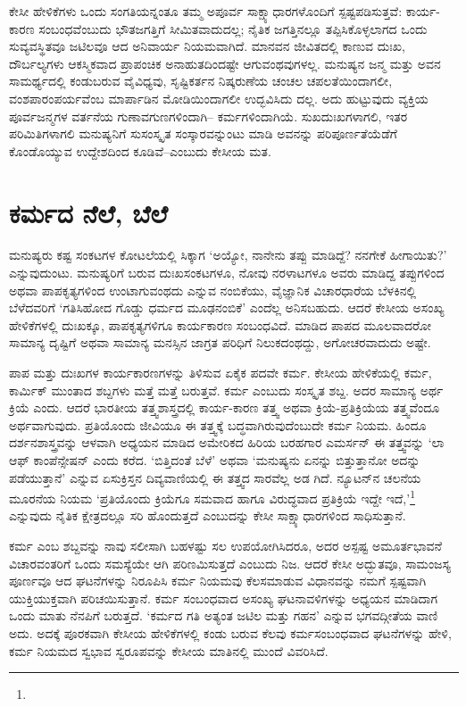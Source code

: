 ಕೇಸೀ ಹೇಳಿಕೆಗಳು ಒಂದು ಸಂಗತಿಯನ್ನಂತೂ ತಮ್ಮ ಅಪೂರ್ವ ಸಾಕ್ಷ್ಯಾಧಾರಗಳೊಂದಿಗೆ ಸ್ಪಷ್ಟಪಡಿಸುತ್ತವೆ: ಕಾರ್ಯ-ಕಾರಣ ಸಂಬಂಧವೆಂಬುದು ಭೌತಜಗತ್ತಿಗೆ ಸೀಮಿತವಾದುದಲ್ಲ; ನೈತಿಕ ಜಗತ್ತಿನಲ್ಲೂ ತಪ್ಪಿಸಿಕೊಳ್ಳಲಾಗದ ಒಂದು ಸುವ್ಯವಸ್ಥಿತವೂ ಜಟಿಲವೂ ಆದ ಅನಿವಾರ್ಯ ನಿಯಮವಾಗಿದೆ. ಮಾನವನ ಜೀವಿತದಲ್ಲಿ ಕಾಣುವ ದುಃಖ, ದೌರ್ಬಲ್ಯಗಳು ಆಕಸ್ಮಿಕವಾದ ಪ್ರಾಪಂಚಿಕ ಅನಾಹುತದಿಂದಷ್ಟೇ ಆಗುವಂಥವುಗಳಲ್ಲ. ಮನುಷ್ಯನ ಜನ್ಮ ಮತ್ತು ಅವನ ಸಾಮರ್ಥ್ಯದಲ್ಲಿ ಕಂಡುಬರುವ ವೈವಿಧ್ಯವು, ಸೃಷ್ಟಿಕರ್ತನ ನಿಷ್ಕರುಣೆಯ ಚಂಚಲ ಚಪಲತೆಯಿಂದಾಗಲೀ, ವಂಶಪಾರಂಪರ್ಯವೆಂಬ ಮಾರ್ಪಾಡಿನ ಮೋಡಿಯಿಂದಾಗಲೀ ಉದ್ಭವಿಸಿದು ದಲ್ಲ. ಅದು ಹುಟ್ಟುವುದು ವ್ಯಕ್ತಿಯ ಪೂರ್ವಜನ್ಮಗಳ ವರ್ತನೆಯ ಗುಣಾವಗುಣಗಳಿಂದಾಗಿ– ಕರ್ಮಗಳಿಂದಾಗಿಯೆ. ಸುಖದುಃಖಗಳಾಗಲಿ, ಇತರ ಪರಿಮಿತಿಗಳಾಗಲಿ ಮನುಷ್ಯನಿಗೆ ಸುಸಂಸ್ಕೃತ ಸಂಸ್ಕಾರವನ್ನುಂಟು ಮಾಡಿ ಅವನನ್ನು ಪರಿಪೂರ್ಣತೆಯೆಡೆಗೆ ಕೊಂಡೊಯ್ಯುವ ಉದ್ದೇಶದಿಂದ ಕೂಡಿವೆ–ಎಂಬುದು ಕೇಸೀಯ ಮತ.


\section{ಕರ್ಮದ ನೆಲೆ, ಬೆಲೆ}

ಮನುಷ್ಯರು ಕಷ್ಟ ಸಂಕಟಗಳ ಕೋಟಲೆಯಲ್ಲಿ ಸಿಕ್ಕಾಗ ‘ಅಯ್ಯೋ, ನಾನೇನು ತಪ್ಪು ಮಾಡಿದ್ದೆ? ನನಗೇಕೆ ಹೀಗಾಯಿತು?’ ಎನ್ನುವುದುಂಟು. ಮನುಷ್ಯರಿಗೆ ಬರುವ ದುಃಖಸಂಕಟಗಳೂ, ನೋವು ನರಳಾಟಗಳೂ ಅವರು ಮಾಡಿದ್ದ ತಪ್ಪುಗಳಿಂದ ಅಥವಾ ಪಾಪಕೃತ್ಯಗಳಿಂದ ಉಂಟಾಗುವಂಥದು ಎನ್ನುವ ನಂಬಿಕೆಯು, ವೈಜ್ಞಾನಿಕ ವಿಚಾರಧಾರೆಯ ಬೆಳಕಿನಲ್ಲಿ ಬೆಳೆದವರಿಗೆ ‘ಗತಿಸಿಹೋದ ಗೊಡ್ಡು ಧರ್ಮದ ಮೂಢನಂಬಿಕೆ’ ಎಂದೆಲ್ಲ ಅನಿಸಬಹುದು. ಆದರೆ ಕೇಸೀಯ ಅಸಂಖ್ಯ ಹೇಳಿಕೆಗಳಲ್ಲಿ ದುಃಖಕ್ಕೂ, ಪಾಪಕೃತ್ಯಗಳಿಗೂ ಕಾರ್ಯಕಾರಣ ಸಂಬಂಧವಿದೆ. ಮಾಡಿದ ಪಾಪದ ಮೂಲವಾದರೋ ಸಾಮಾನ್ಯ ದೃಷ್ಟಿಗೆ ಅಥವಾ ಸಾಮಾನ್ಯ ಮನಸ್ಸಿನ ಜಾಗ್ರತ ಪರಿಧಿಗೆ ನಿಲುಕದಂಥದ್ದು, ಅಗೋಚರವಾದುದು ಅಷ್ಟೇ.

ಪಾಪ ಮತ್ತು ದುಃಖಗಳ ಕಾರ್ಯಕಾರಣಗಳನ್ನು ತಿಳಿಸುವ ಏಕೈಕ ಪದವೇ ಕರ್ಮ. ಕೇಸೀಯ ಹೇಳಿಕೆಯಲ್ಲಿ ಕರ್ಮ, ಕಾರ್ಮಿಕ್  ಮುಂತಾದ ಶಬ್ದಗಳು ಮತ್ತೆ ಮತ್ತೆ ಬರುತ್ತವೆ. ಕರ್ಮ ಎಂಬುದು ಸಂಸ್ಕೃತ ಶಬ್ದ. ಅದರ ಸಾಮಾನ್ಯ ಅರ್ಥ ಕ್ರಿಯೆ ಎಂದು. ಆದರೆ ಭಾರತೀಯ ತತ್ತ್ವಶಾಸ್ತ್ರದಲ್ಲಿ ಕಾರ್ಯ-ಕಾರಣ ತತ್ತ್ವ ಅಥವಾ ಕ್ರಿಯೆ-ಪ್ರತಿಕ್ರಿಯೆಯ ತತ್ತ್ವವೆಂದೂ ಅರ್ಥವಾಗುವುದು. ಪ್ರತಿಯೊಂದು ಜೀವಿಯೂ ಈ ತತ್ತ್ವಕ್ಕೆ ಬದ್ಧವಾಗಿರುವುದೆಂಬುದೇ ಕರ್ಮ ನಿಯಮ. ಹಿಂದೂ ದರ್ಶನಶಾಸ್ತ್ರವನ್ನು ಆಳವಾಗಿ ಅಧ್ಯಯನ ಮಾಡಿದ ಅಮೇರಿಕದ ಹಿರಿಯ ಬರಹಗಾರ ಎಮರ್ಸನ್ ಈ ತತ್ತ್ವವನ್ನು ‘ಲಾ ಆಫ್ ಕಾಂಪೆನ್ಸೇಷನ್​ ಎಂದು ಕರೆದ. ‘ಬಿತ್ತಿದಂತೆ ಬೆಳೆ’ ಅಥವಾ ‘ಮನುಷ್ಯನು ಏನನ್ನು ಬಿತ್ತುತ್ತಾನೋ ಅದನ್ನು ಪಡೆಯುತ್ತಾನೆ’ ಎನ್ನುವ ಏಸುಕ್ರಿಸ್ತನ ದಿವ್ಯವಾಣಿಯಲ್ಲಿ ಈ ತತ್ತ್ವದ ಸಾರವೆಲ್ಲ ಅಡ ಗಿದೆ. ನ್ಯೂಟನ್​ನ ಚಲನೆಯ ಮೂರನೆಯ ನಿಯಮ ‘ಪ್ರತಿಯೊಂದು ಕ್ರಿಯೆಗೂ ಸಮವಾದ ಹಾಗೂ ವಿರುದ್ಧವಾದ ಪ್ರತಿಕ್ರಿಯೆ ಇದ್ದೇ ಇದೆ,’\footnote{} ಎನ್ನುವುದು ನೈತಿಕ ಕ್ಷೇತ್ರದಲ್ಲೂ ಸರಿ ಹೊಂದುತ್ತದೆ ಎಂಬುದನ್ನು ಕೇಸೀ ಸಾಕ್ಷ್ಯಾಧಾರಗಳಿಂದ ಸಾಧಿಸುತ್ತಾನೆ.

ಕರ್ಮ ಎಂಬ ಶಬ್ದವನ್ನು ನಾವು ಸಲೀಸಾಗಿ ಬಹಳಷ್ಟು ಸಲ ಉಪಯೋಗಿಸಿದರೂ, ಅದರ ಅಸ್ಪಷ್ಟ ಅಮೂರ್ತಭಾವನೆ ವಿಚಾರವಂತರಿಗೆ ಒಂದು ಸಮಸ್ಯೆಯೇ ಆಗಿ ಪರಿಣಮಿಸುತ್ತದೆ ಎಂಬುದು ನಿಜ. ಆದರೆ ಕೇಸೀ ಅದ್ಭುತವೂ, ಸಾಮಂಜಸ್ಯ ಪೂರ್ಣವೂ ಆದ ಘಟನೆಗಳನ್ನು ನಿರೂಪಿಸಿ ಕರ್ಮ ನಿಯಮವು ಕೆಲಸಮಾಡುವ ವಿಧಾನವನ್ನು ನಮಗೆ ಸ್ಪಷ್ಟವಾಗಿ ಯುಕ್ತಿಯುಕ್ತವಾಗಿ ಪರಿಚಯಿಸುತ್ತಾನೆ. ಕರ್ಮ ಸಂಬಂಧವಾದ ಅಸಂಖ್ಯ ಘಟನಾವಳಿಗಳನ್ನು ಅಧ್ಯಯನ ಮಾಡಿದಾಗ ಒಂದು ಮಾತು ನೆನಪಿಗೆ ಬರುತ್ತದೆ. ‘ಕರ್ಮದ ಗತಿ ಅತ್ಯಂತ ಜಟಿಲ ಮತ್ತು ಗಹನ’ ಎನ್ನುವ ಭಗವದ್ಗೀತೆಯ ವಾಣಿ ಅದು. ಅದಕ್ಕೆ ಪೂರಕವಾಗಿ ಕೇಸೀಯ ಹೇಳಿಕೆಗಳಲ್ಲಿ ಕಂಡು ಬರುವ ಕೆಲವು ಕರ್ಮಸಂಬಂಧವಾದ ಘಟನೆಗಳನ್ನು ಹೇಳಿ, ಕರ್ಮ ನಿಯಮದ ಸ್ವಭಾವ ಸ್ವರೂಪವನ್ನು ಕೇಸೀಯ ಮಾತಿನಲ್ಲಿ ಮುಂದೆ ವಿವರಿಸಿದೆ.


